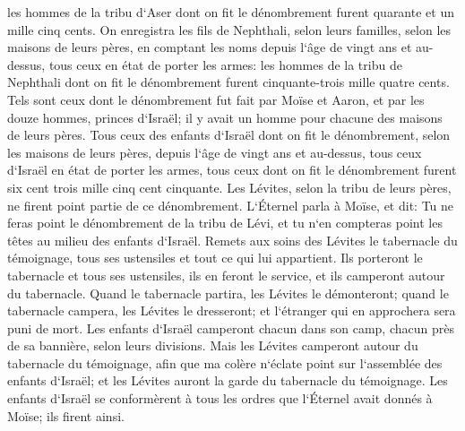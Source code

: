 \verse les hommes de la tribu d`Aser dont on fit le dénombrement furent quarante et un mille cinq cents. 
\verse On enregistra les fils de Nephthali, selon leurs familles, selon les maisons de leurs pères, en comptant les noms depuis l`âge de vingt ans et au-dessus, tous ceux en état de porter les armes: 
\verse les hommes de la tribu de Nephthali dont on fit le dénombrement furent cinquante-trois mille quatre cents. 
\verse Tels sont ceux dont le dénombrement fut fait par Moïse et Aaron, et par les douze hommes, princes d`Israël; il y avait un homme pour chacune des maisons de leurs pères. 
\verse Tous ceux des enfants d`Israël dont on fit le dénombrement, selon les maisons de leurs pères, depuis l`âge de vingt ans et au-dessus, tous ceux d`Israël en état de porter les armes, 
\verse tous ceux dont on fit le dénombrement furent six cent trois mille cinq cent cinquante. 
\verse Les Lévites, selon la tribu de leurs pères, ne firent point partie de ce dénombrement. 
\verse L`Éternel parla à Moïse, et dit: 
\verse Tu ne feras point le dénombrement de la tribu de Lévi, et tu n`en compteras point les têtes au milieu des enfants d`Israël. 
\verse Remets aux soins des Lévites le tabernacle du témoignage, tous ses ustensiles et tout ce qui lui appartient. Ils porteront le tabernacle et tous ses ustensiles, ils en feront le service, et ils camperont autour du tabernacle. 
\verse Quand le tabernacle partira, les Lévites le démonteront; quand le tabernacle campera, les Lévites le dresseront; et l`étranger qui en approchera sera puni de mort. 
\verse Les enfants d`Israël camperont chacun dans son camp, chacun près de sa bannière, selon leurs divisions. 
\verse Mais les Lévites camperont autour du tabernacle du témoignage, afin que ma colère n`éclate point sur l`assemblée des enfants d`Israël; et les Lévites auront la garde du tabernacle du témoignage. 
\verse Les enfants d`Israël se conformèrent à tous les ordres que l`Éternel avait donnés à Moïse; ils firent ainsi. 


